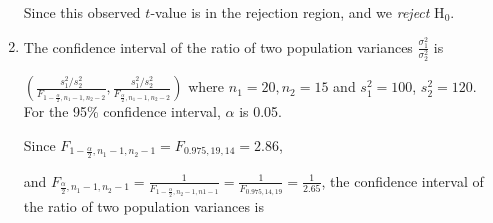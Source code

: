 \begin{enumerate}[Q 1.]
Since this observed $t$-value is in the rejection region, and we \emph{reject} H$_0$.
\item

\sol The confidence interval of the ratio of two population variances $\frac{\sigma_1^2}{\sigma_2^2}$ is
	
$\left(\frac{s_1^2/s_2^2}{F_{1-\frac{\alpha}{2},n_1-1,n_2-2}},\frac{s_1^2/s_2^2}{F_{\frac{\alpha}{2},n_1-1,n_2-2}}\right)$ where $n_1=20, n_2=15$ and $s_1^2=100$, $s_2^2=120$.\\
	

For the 95\% confidence interval, $\alpha$ is 0.05.
		
Since $F_{1-\frac{\alpha}{2},n_1-1,n_2-1}=F_{0.975,19,14}=2.86$,
		
and $F_{\frac{\alpha}{2},n_1-1,n_2-1}=\frac{1}{F_{1-\frac{\alpha}{2},n_2-1,n1-1}}=\frac{1}{F_{0.975,14,19}}=\frac{1}{2.65}$, the confidence interval of the ratio of two population variances is
		

\end{enumerate}
